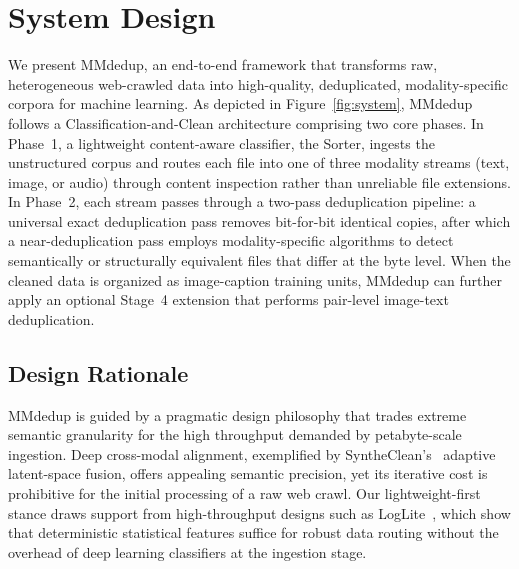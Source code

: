 \documentclass[conference]{IEEEtran}
\begin{document}
\section{System Design}
\label{sec:design}


We present MMdedup, an end-to-end framework that transforms raw, heterogeneous web-crawled data into high-quality, deduplicated, modality-specific corpora for machine learning. As depicted in Figure~\ref{fig:system}, MMdedup follows a Classification-and-Clean architecture comprising two core phases. In Phase~1, a lightweight content-aware classifier, the Sorter, ingests the unstructured corpus and routes each file into one of three modality streams (text, image, or audio) through content inspection rather than unreliable file extensions. In Phase~2, each stream passes through a two-pass deduplication pipeline: a universal exact deduplication pass removes bit-for-bit identical copies, after which a near-deduplication pass employs modality-specific algorithms to detect semantically or structurally equivalent files that differ at the byte level. When the cleaned data is organized as image-caption training units, MMdedup can further apply an optional Stage~4 extension that performs pair-level image-text deduplication.


\subsection{Design Rationale}

MMdedup is guided by a pragmatic design philosophy that trades extreme semantic granularity for the high throughput demanded by petabyte-scale ingestion. Deep cross-modal alignment, exemplified by SyntheClean's~\cite{chen2025syntheclean} adaptive latent-space fusion, offers appealing semantic precision, yet its iterative cost is prohibitive for the initial processing of a raw web crawl. Our lightweight-first stance draws support from high-throughput designs such as LogLite~\cite{tang2025loglite}, which show that deterministic statistical features suffice for robust data routing without the overhead of deep learning classifiers at the ingestion stage.
\end{document}
